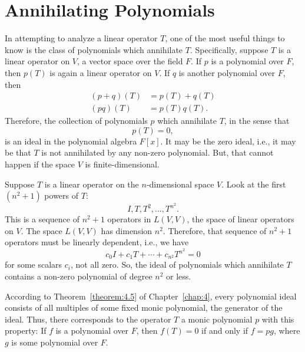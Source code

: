 \section{Annihilating Polynomials}

In attempting to analyze a linear operator \(T\), one of the most useful things to know is the class of polynomials which annihilate \(T\). Specifically, suppose \(T\) is a linear operator on \(V\), a vector space over the field \(F\). If \(p\) is a polynomial over \(F\), then \(p\left(T\right)\) is again a linear operator on \(V\). If \(q\) is another polynomial over \(F\), then
\begin{align*}
    \left(p+q\right)\left(T\right)&=p\left(T\right)+q\left(T\right)\\
    \left(pq\right)\left(T\right)&=p\left(T\right)q\left(T\right).
\end{align*}
Therefore, the collection of polynomials \(p\) which annihilate \(T\), in the sense that
\begin{equation*}
    p\left(T\right)=0,
\end{equation*}
is an ideal in the polynomial algebra \(F\left[x\right]\). It may be the zero ideal, i.e., it may be that \(T\) is not annihilated by any non-zero polynomial. But, that cannot happen if the space \(V\) is finite-dimensional.

Suppose \(T\) is a linear operator on the \(n\)-dimensional space \(V\). Look at the first \(\left(n^2+1\right)\) powers of \(T\):
\begin{equation*}
    I,T,T^2,\ldots,T^{n^2}.
\end{equation*}
This is a sequence of \(n^2+1\) operators in \(L\left(V,V\right)\), the space of linear operators on \(V\). The space \(L\left(V,V\right)\) has dimension \(n^2\). Therefore, that sequence of \(n^2+1\) operators must be linearly dependent, i.e., we have
\begin{equation*}
    c_0I+c_1T+\cdots+c_{n^2}T^{n^2}=0
\end{equation*}
for some scalars \(c_i\), not all zero. So, the ideal of polynomials which annihilate \(T\) contains a non-zero polynomial of degree \(n^2\) or less.

According to Theorem~\ref{theorem:4.5} of Chapter~\ref{chap:4}, every polynomial ideal consists of all multiples of some fixed monic polynomial, the generator of the ideal. Thus, there corresponds to the operator \(T\) a monic polynomial \(p\) with this property: If \(f\) is a polynomial over \(F\), then \(f\left(T\right)=0\) if and only if \(f=pg\), where \(g\) is some polynomial over \(F\).


